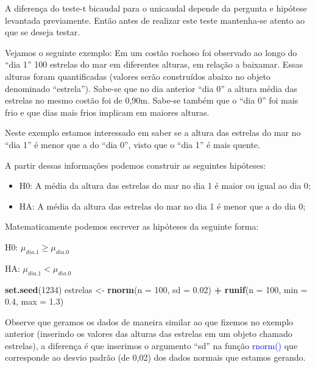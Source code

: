 \documentclass[14pt,titlepage, oneside, openany, a4paper]{book}
\newenvironment{Shaded}{\begin{snugshade}}{\end{snugshade}}
\newcommand{\DataTypeTok}[1]{\textcolor[rgb]{0.13,0.29,0.53}{#1}}
\newcommand{\DecValTok}[1]{\textcolor[rgb]{0.00,0.00,0.81}{#1}}
\newcommand{\FloatTok}[1]{\textcolor[rgb]{0.00,0.00,0.81}{#1}}
\newcommand{\KeywordTok}[1]{\textcolor[rgb]{0.13,0.29,0.53}{\textbf{#1}}}
\newcommand{\NormalTok}[1]{#1}
\newcommand{\OperatorTok}[1]{\textcolor[rgb]{0.81,0.36,0.00}{\textbf{#1}}}
\newcommand{\StringTok}[1]{\textcolor[rgb]{0.31,0.60,0.02}{#1}}
\begin{document}
A diferença do teste-t bicaudal para o unicaudal depende da pergunta e hipótese levantada previamente. Então antes de realizar este teste mantenha-se atento ao que se deseja testar.

Vejamos o seguinte exemplo: Em um costão rochoso foi observado ao longo do ``dia 1'' 100 estrelas do mar em diferentes alturas, em relação a baixamar. Essas alturas foram quantificadas (valores serão construídos abaixo no objeto denominado ``estrela''). Sabe-se que no dia anterior ``dia 0'' a altura média das estrelas no mesmo costão foi de 0,90m. Sabe-se também que o ``dia 0'' foi mais frio e que dias mais frios implicam em maiores alturas.

Neste exemplo estamos interessado em saber se a altura das estrelas do mar no ``dia 1'' é menor que a do ``dia 0'', visto que o ``dia 1'' é mais quente.

A partir dessas informações podemos construir as seguintes hipóteses:

\begin{itemize}
\item
  H0: A média da altura das estrelas do mar no dia 1 é maior ou igual ao dia 0;
\item
  HA: A média da altura das estrelas do mar no dia 1 é menor que a do dia 0;
\end{itemize}

Matematicamente podemos escrever as hipóteses da seguinte forma:

H0: \(\mu_{dia.1} \geq \mu_{dia.0}\)

HA: \(\mu_{dia.1} < \mu_{dia.0}\)

\begin{Shaded}
\begin{Highlighting}[]
\KeywordTok{set.seed}\NormalTok{(}\DecValTok{1234}\NormalTok{)}
\NormalTok{estrelas <-}\StringTok{ }\KeywordTok{rnorm}\NormalTok{(}\DataTypeTok{n =} \DecValTok{100}\NormalTok{, }\DataTypeTok{sd =} \FloatTok{0.02}\NormalTok{) }\OperatorTok{+}\StringTok{ }\KeywordTok{runif}\NormalTok{(}\DataTypeTok{n =} \DecValTok{100}\NormalTok{, }\DataTypeTok{min =} \FloatTok{0.4}\NormalTok{, }\DataTypeTok{max =} \FloatTok{1.3}\NormalTok{)}
\end{Highlighting}
\end{Shaded}

Observe que geramos os dados de maneira similar ao que fizemos no exemplo anterior (inserindo os valores das alturas das estrelas em um objeto chamado estrelas), a diferença é que inserimos o argumento ``sd'' na função \textcolor{blue}{rnorm()} que corresponde ao desvio padrão (de 0,02) dos dados normais que estamos gerando.
\end{document}
